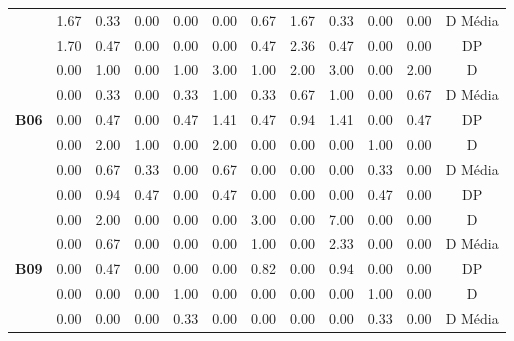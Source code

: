 \begin{table}[htbp]
\begin{tabular}{|c|c|c|c|c|c|c|c|c|c|c|c}
		\cellcolor[HTML]{F2F2F2} & 1.67 & 0.33 & 0.00 & 0.00 & 0.00 & 0.67 & 1.67 & 0.33 & 0.00 & 0.00 & \multicolumn{1}{c|}{D Média} \\ \cline{2-12} 
		\rowcolor[HTML]{D9D9D9} 
		\multirow{-3}{*}{\cellcolor[HTML]{F2F2F2}\textbf{B05}} & 1.70 & 0.47 & 0.00 & 0.00 & 0.00 & 0.47 & 2.36 & 0.47 & 0.00 & 0.00 & \multicolumn{1}{c|}{\cellcolor[HTML]{D9D9D9}DP} \\ \hline
		\cellcolor[HTML]{F2F2F2} & 0.00 & 1.00 & 0.00 & 1.00 & 3.00 & 1.00 & 2.00 & 3.00 & 0.00 & 2.00 & \multicolumn{1}{c|}{D} \\ \cline{2-12} 
		\rowcolor[HTML]{D9D9D9} 
		\cellcolor[HTML]{F2F2F2} & 0.00 & 0.33 & 0.00 & 0.33 & 1.00 & 0.33 & 0.67 & 1.00 & 0.00 & 0.67 & \multicolumn{1}{c|}{\cellcolor[HTML]{D9D9D9}D Média} \\ \cline{2-12} 
		\multirow{-3}{*}{\cellcolor[HTML]{F2F2F2}\textbf{B06}} & 0.00 & 0.47 & 0.00 & 0.47 & 1.41 & 0.47 & 0.94 & 1.41 & 0.00 & 0.47 & \multicolumn{1}{c|}{DP} \\ \hline
		\rowcolor[HTML]{D9D9D9} 
		\cellcolor[HTML]{F2F2F2} & 0.00 & 2.00 & 1.00 & 0.00 & 2.00 & 0.00 & 0.00 & 0.00 & 1.00 & 0.00 & \multicolumn{1}{c|}{\cellcolor[HTML]{D9D9D9}D} \\ \cline{2-12} 
		\cellcolor[HTML]{F2F2F2} & 0.00 & 0.67 & 0.33 & 0.00 & 0.67 & 0.00 & 0.00 & 0.00 & 0.33 & 0.00 & \multicolumn{1}{c|}{D Média} \\ \cline{2-12} 
		\rowcolor[HTML]{D9D9D9} 
		\multirow{-3}{*}{\cellcolor[HTML]{F2F2F2}\textbf{B08}} & 0.00 & 0.94 & 0.47 & 0.00 & 0.47 & 0.00 & 0.00 & 0.00 & 0.47 & 0.00 & \multicolumn{1}{c|}{\cellcolor[HTML]{D9D9D9}DP} \\ \hline
		\cellcolor[HTML]{F2F2F2} & 0.00 & 2.00 & 0.00 & 0.00 & 0.00 & 3.00 & 0.00 & 7.00 & 0.00 & 0.00 & \multicolumn{1}{c|}{D} \\ \cline{2-12} 
		\rowcolor[HTML]{D9D9D9} 
		\cellcolor[HTML]{F2F2F2} & 0.00 & 0.67 & 0.00 & 0.00 & 0.00 & 1.00 & 0.00 & 2.33 & 0.00 & 0.00 & \multicolumn{1}{c|}{\cellcolor[HTML]{D9D9D9}D Média} \\ \cline{2-12} 
		\multirow{-3}{*}{\cellcolor[HTML]{F2F2F2}\textbf{B09}} & 0.00 & 0.47 & 0.00 & 0.00 & 0.00 & 0.82 & 0.00 & 0.94 & 0.00 & 0.00 & \multicolumn{1}{c|}{DP} \\ \hline
		\rowcolor[HTML]{D9D9D9} 
		\cellcolor[HTML]{F2F2F2} & 0.00 & 0.00 & 0.00 & 1.00 & 0.00 & 0.00 & 0.00 & 0.00 & 1.00 & 0.00 & \multicolumn{1}{c|}{\cellcolor[HTML]{D9D9D9}D} \\ \cline{2-12} 
		\cellcolor[HTML]{F2F2F2} & 0.00 & 0.00 & 0.00 & 0.33 & 0.00 & 0.00 & 0.00 & 0.00 & 0.33 & 0.00 & \multicolumn{1}{c|}{D Média} \\ \cline{2-12} 

\end{tabular}
\end{table}
